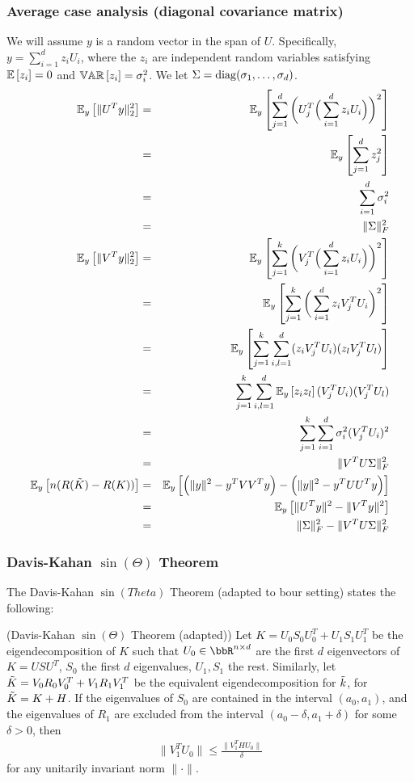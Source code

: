 \subsubsection{Average case analysis (diagonal covariance matrix)}
We will assume $y$ is a random vector in the span of $U$.
Specifically, $y = \sum_{i=1}^d z_i U_i$, where the $z_i$ are independent random variables satisfying $\expect{}{z_i} = 0$ and $\var{}{z_i} = \sigma_i^2$.
We let $\Sigma = \diag(\sigma_1,\ldots,\sigma_d)$.
\begin{eqnarray*}
	\expect{y}{\|U^T y\|_2^2} &=& \expect{y}{\sum_{j=1}^d \bigg( U_j^T \Big(\sum_{i=1}^d z_i U_i\Big)\bigg)^2} \\
	&=& \expect{y}{\sum_{j=1}^d z_j^2} \\
	&=& \sum_{i=1}^d \sigma_i^2 \\
	&=& \|\Sigma\|_F^2 \\
	\expect{y}{\|V^T y\|_2^2} &=& \expect{y}{\sum_{j=1}^k \bigg( V_j^T \Big(\sum_{i=1}^d z_i U_i\Big)\bigg)^2} \\
	&=& \expect{y}{\sum_{j=1}^k \bigg(\sum_{i=1}^d z_i V_j^TU_i\bigg)^2} \\
	&=& \expect{y}{\sum_{j=1}^k \sum_{i,l=1}^d (z_i V_j^TU_i) (z_l V_j^TU_l) }\\
	&=& \sum_{j=1}^k \sum_{i,l=1}^d \expect{y}{z_i z_l} (V_j^TU_i) (V_j^TU_l) \\
	&=& \sum_{j=1}^k \sum_{i=1}^d \sigma_i^2 (V_j^TU_i)^2 \\
	&=& \|V^T U \Sigma\|_F^2\\
	\expect{y}{n(R(\tK) - R(K))} &=& \expect{y}{\Big(\|y\|^2 - y^T VV^T y\Big) - \Big(\|y\|^2 - y^T UU^T y\Big)}\\
	&=& \expect{y}{\|U^T y\|^2 - \|V^Ty\|^2}\\
	&=& \|\Sigma\|_F^2 -  \|V^T U\Sigma\|_F^2\\
\end{eqnarray*}

\subsubsection{Davis-Kahan $\sin(\Theta)$ Theorem}
The Davis-Kahan $\sin(Theta)$ Theorem (adapted to bour setting) states the following:
\begin{theorem}{(Davis-Kahan $\sin(\Theta)$ Theorem (adapted))}
Let $K=U_0 S_0 U_0^T + U_1 S_1 U_1^T$ be the eigendecomposition of $K$ such that $U_0 \in \RR^{n \times d}$ are the first $d$ eigenvectors of $K=USU^T$, $S_0$ the first $d$ eigenvalues, $U_1,S_1$ the rest.
Similarly, let $\tK = V_0 R_0 V_0^T + V_1 R_1 V_1^T$ be the equivalent eigendecomposition for $\tk$, for $\tK = K + H$.
If the eigenvalues of $S_0$ are contained in the interval $(a_0,a_1)$, and the eigenvalues of $R_1$ are excluded from the interval $(a_0 - \delta,a_1 +\delta)$ for some $\delta>0$, then
\begin{eqnarray}
\|V_1^T U_0\| \leq \frac{\|V_1^T H U_0\|}{\delta}
\end{eqnarray}
for any unitarily invariant norm $\|\cdot \|$.
\end{theorem}

